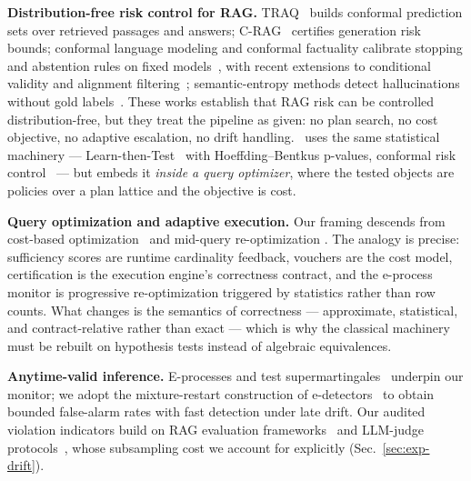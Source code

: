 \noindent\textbf{Distribution-free risk control for RAG.}
TRAQ~\cite{li2024traq} builds conformal prediction sets over retrieved
passages and answers; C-RAG~\cite{kang2024crag} certifies generation risk
bounds; conformal language modeling and conformal factuality calibrate
stopping and abstention rules on fixed
models~\cite{quach2024conformallm,mohri2024factuality}, with recent
extensions to conditional validity and alignment
filtering~\cite{cherian2024validity,gui2024conformalalign};
semantic-entropy methods detect hallucinations without gold
labels~\cite{farquhar2024semantic}. These works establish that RAG
risk can be controlled distribution-free, but they treat the pipeline as
given: no plan search, no cost objective, no adaptive escalation, no
drift handling. \system\ uses the same statistical machinery ---
Learn-then-Test~\cite{angelopoulos2021ltt} with Hoeffding--Bentkus
p-values, conformal risk control~\cite{angelopoulos2024crc} --- but embeds
it \emph{inside a query optimizer}, where the tested objects are policies
over a plan lattice and the objective is cost.

\noindent\textbf{Query optimization and adaptive execution.} Our framing
descends from cost-based optimization~\cite{selinger1979access,
graefe1995cascades} and mid-query re-optimization
\cite{kabra1998efficient,markl2004robust}. The analogy is precise:
sufficiency scores are runtime cardinality feedback, vouchers are the cost
model, certification is the execution engine's correctness contract, and
the e-process monitor is progressive re-optimization triggered by
statistics rather than row counts. What changes is the semantics of
correctness --- approximate, statistical, and contract-relative rather than
exact --- which is why the classical machinery must be rebuilt on
hypothesis tests instead of algebraic equivalences.

\noindent\textbf{Anytime-valid inference.} E-processes and test
supermartingales~\cite{ville1939etude,shafer2021testing,ramdas2023savi,
grunwald2024safe}
underpin our monitor; we adopt the mixture-restart construction of
e-detectors~\cite{shin2024edetectors} to obtain bounded false-alarm rates
with fast detection under late drift. Our audited violation indicators
build on RAG evaluation frameworks~\cite{es2024ragas,saadfalcon2024ares,
ru2024ragchecker} and LLM-judge protocols~\cite{zheng2023judging}, whose
subsampling cost we account for explicitly
(Sec.~\ref{sec:exp-drift}).
